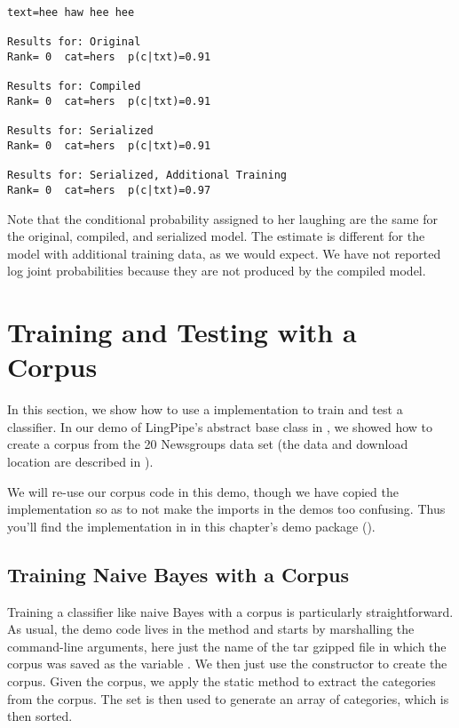 \begin{verbatim}
text=hee haw hee hee

Results for: Original
Rank= 0  cat=hers  p(c|txt)=0.91

Results for: Compiled
Rank= 0  cat=hers  p(c|txt)=0.91

Results for: Serialized
Rank= 0  cat=hers  p(c|txt)=0.91

Results for: Serialized, Additional Training
Rank= 0  cat=hers  p(c|txt)=0.97
\end{verbatim}

Note that the conditional probability assigned to her laughing are the
same for the original, compiled, and serialized model.  The estimate
is different for the model with additional training data, as we
would expect.  We have not reported log joint probabilities because
they are not produced by the compiled model.


\section{Training and Testing with a Corpus}

In this section, we show how to use a  implementation to
train and test a classifier.  In our demo of LingPipe's 
abstract base class in , we showed
how to create a corpus from the 20 Newsgroups data set (the data
and download location are described in ).

We will re-use our corpus code in this demo, though we have copied the
implementation so as to not make the imports in the demos too
confusing.  Thus you'll find the implementation in
 in this chapter's demo package
().

\subsection{Training Naive Bayes with a Corpus}

Training a classifier like naive Bayes with a corpus is particularly
straightforward.  As usual, the demo code lives in the 
method and starts by marshalling the command-line arguments, here just
the name of the tar gzipped file in which the corpus was saved as
the  variable .  We
then just use the constructor to create the corpus. 
%
%
Given the corpus, we apply the static method  to
extract the categories from the corpus.  The set is then used to generate
an array of categories, which is then sorted.

